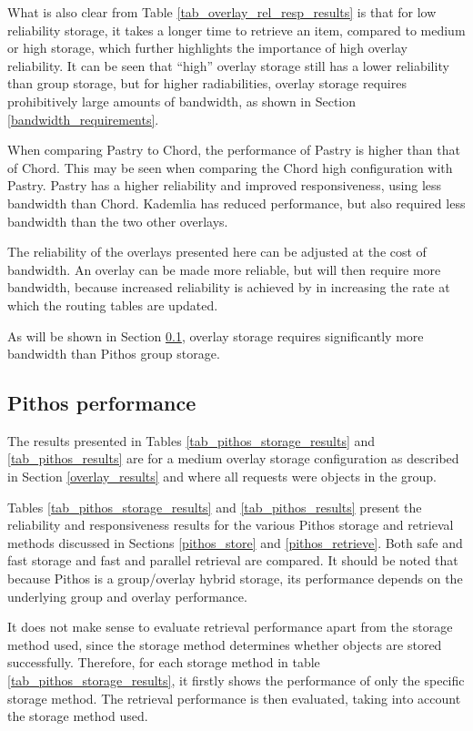 What is also clear from Table \ref{tab_overlay_rel_resp_results} is that for low reliability storage, it takes a longer time to retrieve an item, compared to medium or high storage, which further highlights the importance of high overlay reliability. It can be seen that ``high'' overlay storage still has a lower reliability than group storage, but for higher radiabilities, overlay storage requires prohibitively large amounts of bandwidth, as shown in Section \ref{bandwidth_requirements}.

When comparing Pastry to Chord, the performance of Pastry is higher than that of Chord. This may be seen when comparing the Chord high configuration with Pastry. Pastry has a higher reliability and improved responsiveness, using less bandwidth than Chord. Kademlia has reduced performance, but also required less bandwidth than the two other overlays.

The reliability of the overlays presented here can be adjusted at the cost of bandwidth. An overlay can be made more reliable, but will then require more bandwidth, because increased reliability is achieved by in increasing the rate at which the routing tables are updated.

As will be shown in Section \ref{pithos_resp_rel_results}, overlay storage requires significantly more bandwidth than Pithos group storage.

\subsection{Pithos performance}
\label{pithos_resp_rel_results}

The results presented in Tables \ref{tab_pithos_storage_results} and \ref{tab_pithos_results} are for a medium overlay storage configuration as described in Section \ref{overlay_results} and where all requests were objects in the group.

Tables \ref{tab_pithos_storage_results} and \ref{tab_pithos_results} present the reliability and responsiveness results for the various Pithos storage and retrieval methods discussed in Sections \ref{pithos_store} and \ref{pithos_retrieve}. Both safe and fast storage and fast and parallel retrieval are compared. It should be noted that because Pithos is a group/overlay hybrid storage, its performance depends on the underlying group and overlay performance.

It does not make sense to evaluate retrieval performance apart from the storage method used, since the storage method determines whether objects are stored successfully. Therefore, for each storage method in table \ref{tab_pithos_storage_results}, it firstly shows the performance of only the specific storage method. The retrieval performance is then evaluated, taking into account the storage method used.

